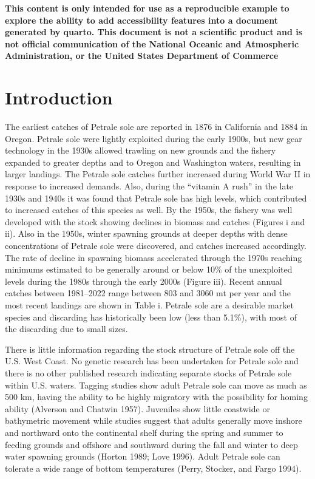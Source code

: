 \documentclass[
]{scrartcl}
\renewcommand*\contentsname{Table of contents}
\newcommand\contentsname{Table of contents}
\begin{document}
\renewcommand*\contentsname{Table of contents}
{
\hypersetup{linkcolor=}
\setcounter{tocdepth}{3}
\tableofcontents
}
\listoffigures
\listoftables
\newpage{}

\textbf{This content is only intended for use as a reproducible example
to explore the ability to add accessibility features into a document
generated by quarto. This document is not a scientific product and is
not official communication of the National Oceanic and Atmospheric
Administration, or the United States Department of Commerce}

\newpage{}

\section{Introduction}\label{sec-intro}

The earliest catches of Petrale sole are reported in 1876 in California
and 1884 in Oregon. Petrale sole were lightly exploited during the early
1900s, but new gear technology in the 1930s allowed trawling on new
grounds and the fishery expanded to greater depths and to Oregon and
Washington waters, resulting in larger landings. The Petrale sole
catches further increased during World War II in response to increased
demands. Also, during the ``vitamin A rush'' in the late 1930s and 1940s
it was found that Petrale sole has high levels, which contributed to
increased catches of this species as well. By the 1950s, the fishery was
well developed with the stock showing declines in biomass and catches
(Figures i and ii). Also in the 1950s, winter spawning grounds at deeper
depths with dense concentrations of Petrale sole were discovered, and
catches increased accordingly. The rate of decline in spawning biomass
accelerated through the 1970s reaching minimums estimated to be
generally around or below 10\% of the unexploited levels during the
1980s through the early 2000s (Figure iii). Recent annual catches
between 1981--2022 range between 803 and 3060 mt per year and the most
recent landings are shown in Table i. Petrale sole are a desirable
market species and discarding has historically been low (less than
5.1\%), with most of the discarding due to small sizes.

There is little information regarding the stock structure of Petrale
sole off the U.S. West Coast. No genetic research has been undertaken
for Petrale sole and there is no other published research indicating
separate stocks of Petrale sole within U.S. waters. Tagging studies show
adult Petrale sole can move as much as 500 km, having the ability to be
highly migratory with the possibility for homing ability (Alverson and
Chatwin 1957). Juveniles show little coastwide or bathymetric movement
while studies suggest that adults generally move inshore and northward
onto the continental shelf during the spring and summer to feeding
grounds and offshore and southward during the fall and winter to deep
water spawning grounds (Horton 1989; Love 1996). Adult Petrale sole can
tolerate a wide range of bottom temperatures (Perry, Stocker, and Fargo
1994).
\end{document}
